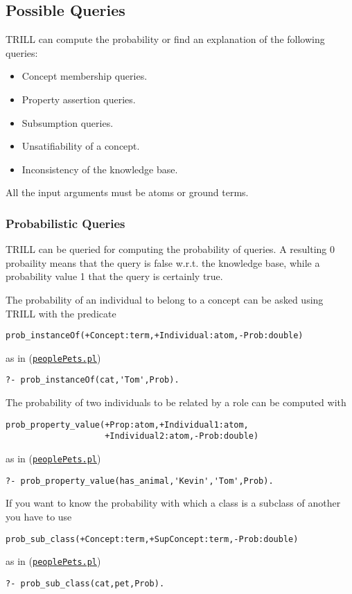 \subsection{Possible Queries}
\label{queries}

TRILL can compute the probability or find an explanation of the following queries:
\begin{itemize}
  \item Concept membership queries.
  \item Property assertion queries.
  \item Subsumption queries.
  \item Unsatifiability of a concept.
  \item Inconsistency of the knowledge base.
\end{itemize}
All the input arguments must be atoms or ground terms.


\subsubsection{Probabilistic Queries}
TRILL can be queried for computing the probability of queries. A resulting 0 probaility means that the query is false w.r.t. the knowledge base, while a probability value 1 that the query is certainly true.

The probability of an individual to belong to a concept can be asked using TRILL with the predicate
\begin{verbatim}
prob_instanceOf(+Concept:term,+Individual:atom,-Prob:double)
\end{verbatim}
as in (\href{http://trill-sw.eu/example/trill/peoplePets.pl}{\texttt{peoplePets.pl}})
\begin{verbatim}
?- prob_instanceOf(cat,'Tom',Prob).
\end{verbatim}

The probability of two individuals to be related by a role can be computed with
\begin{verbatim}
prob_property_value(+Prop:atom,+Individual1:atom,
                    +Individual2:atom,-Prob:double)
\end{verbatim}
as in (\href{http://trill-sw.eu/example/trill/peoplePets.pl}{\texttt{peoplePets.pl}})
\begin{verbatim}
?- prob_property_value(has_animal,'Kevin','Tom',Prob).
\end{verbatim}

If you want to know the probability with which a class is a subclass of another you have to use
\begin{verbatim}
prob_sub_class(+Concept:term,+SupConcept:term,-Prob:double)
\end{verbatim}
as in (\href{http://trill-sw.eu/example/trill/peoplePets.pl}{\texttt{peoplePets.pl}})
\begin{verbatim}
?- prob_sub_class(cat,pet,Prob).
\end{verbatim}

